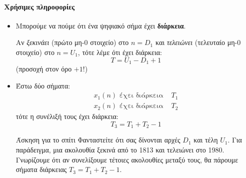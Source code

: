 \documentclass[11pt,a4paper,notitlepage,fleqn]{article}
\begin{document}
\paragraph{Χρήσιμες πληροφορίες}
\begin{itemize}
	\item Μπορούμε να πούμε ότι ένα ψηφιακό σήμα έχει \textbf{διάρκεια}.
	
	\begin{minipage}{0.5\textwidth}
			Αν \emph{ξεκινάει} (πρώτο μη-0 στοιχείο) στο \( n=D_1 \) και \emph{τελειώνει} (τελευταίο μη-0 στοιχείο) στο \( n=U_1 \), τότε λέμε ότι έχει διάρκεια:
		\[
		T = U_1-D_1 + 1
		\]
		(προσοχή στον όρο \( +1 \)!)
	\end{minipage}
\begin{minipage}{0.5\textwidth}
	\begin{center}
	\end{center}
\end{minipage}
	
	\item Έστω δύο σήματα:
	\begin{align*}
		x_1(n) \text{ έχει διάρκεια } & T_1\\
		x_2(n) \text{ έχει διάρκεια } & T_2
	\end{align*}
	τότε η συνέλιξή τους έχει διάρκεια:
	\[
	T_3 = T_1+T_2-1
	\]
	
	\begin{questionbox}{Άσκηση για το σπίτι}
 		Φανταστείτε ότι σας δίνονται αρχές \( D_1 \) και τέλη \( U_1 \). Για παράδειγμα, μια ακολουθία
		ξεκινά από το 1813 και τελειώνει στο 1980. Γνωρίζουμε ότι αν συνελίξουμε τέτοιες ακολουθίες
		μεταξύ τους, θα πάρουμε σήματα διάρκειας \( T_3 = T_1+T_2-1 \).
		

\end{questionbox}
\end{itemize}
\end{document}

